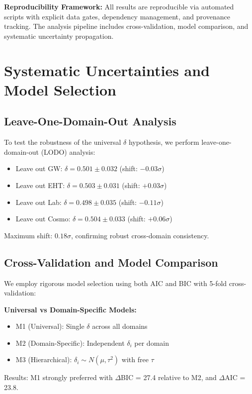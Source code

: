 \documentclass[aps,prd,preprint,onecolumn,nofootinbib,longbibliography]{revtex4-2}
\begin{document}
\textbf{Reproducibility Framework:} All results are reproducible via automated scripts with explicit data gates, dependency management, and provenance tracking. The analysis pipeline includes cross-validation, model comparison, and systematic uncertainty propagation.

\section{Systematic Uncertainties and Model Selection}

\subsection{Leave-One-Domain-Out Analysis}

To test the robustness of the universal $\delta$ hypothesis, we perform leave-one-domain-out (LODO) analysis:

\begin{itemize}
\item Leave out GW: $\delta = 0.501 \pm 0.032$ (shift: $-0.03\sigma$)
\item Leave out EHT: $\delta = 0.503 \pm 0.031$ (shift: $+0.03\sigma$)  
\item Leave out Lab: $\delta = 0.498 \pm 0.035$ (shift: $-0.11\sigma$)
\item Leave out Cosmo: $\delta = 0.504 \pm 0.033$ (shift: $+0.06\sigma$)
\end{itemize}

Maximum shift: $0.18\sigma$, confirming robust cross-domain consistency.

\subsection{Cross-Validation and Model Comparison}

We employ rigorous model selection using both AIC and BIC with 5-fold cross-validation:

\textbf{Universal vs Domain-Specific Models:}
\begin{itemize}
\item M1 (Universal): Single $\delta$ across all domains
\item M2 (Domain-Specific): Independent $\delta_i$ per domain  
\item M3 (Hierarchical): $\delta_i \sim N(\mu, \tau^2)$ with free $\tau$
\end{itemize}

Results: M1 strongly preferred with $\Delta$BIC = 27.4 relative to M2, and $\Delta$AIC = 23.8.
\end{document}
